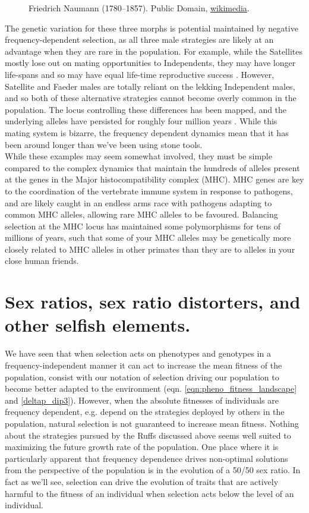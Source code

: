{\begin{figure}
{{{    Friedrich Naumann (1780–1857). Public Domain,
    \href{https://en.wikipedia.org/wiki/Ruff\#/media/File:Philomachus_pugnax_naumann.jpg}{wikimedia}.}}}\label{fig:Ruff}  
\end{figure}
The genetic variation for these three morphs is potential maintained by
negative frequency-dependent selection, as all three male strategies
are likely at an advantage when they are rare in the population. For
example, while the Satellites mostly lose out on mating opportunities
to Independents, they may have longer life-spans and so may have equal
life-time reproductive success \citep{widemo1998alternative}. However, Satellite and Faeder males
are totally reliant on the lekking Independent males, and so both of
these alternative strategies cannot become overly common in the
population. The locus controlling these differences has been mapped,
and the underlying alleles have persisted for roughly four million years
\citep{kupper2016supergene,lamichhaney2016structural}. While this mating system is
bizarre, the frequency dependent dynamics mean that it has been around
longer than we've been using stone tools. \\ 

While these examples may seem somewhat involved, they must be simple
compared to the complex dynamics that maintain the hundreds of alleles
present at the genes in the Major histocompatibility complex (MHC). MHC
genes are key to the coordination of the vertebrate immune
system in response to pathogens, and are likely caught in an endless arms
race with pathogens adapting to common MHC alleles, allowing rare MHC
alleles to be favoured. Balancing selection at the MHC locus has maintained
some polymorphisms for tens of millions of years, such that some of
your MHC alleles may be genetically more closely related to MHC alleles in other primates than they are to alleles in your
close human friends. 


\section{Sex ratios, sex ratio distorters, and other selfish
  elements. }

We have seen that when selection acts on phenotypes and genotypes in a
frequency-independent manner it can act to
increase the mean fitness of the population, consist with our
notation of selection driving our population to become better adapted
to the environment (eqn. \eqref{eqn:pheno_fitness_landscape} and \eqref{deltap_dip3}). However, when the
absolute fitnesses of individuals are frequency dependent, e.g. depend
on the strategies deployed by others in the population, natural
selection is not guaranteed to increase mean fitness. Nothing about
the strategies pursued by the Ruffs discussed above seems well suited to
maximizing the future growth rate of the population. 
One place where it is particularly apparent that frequency dependence
drives non-optimal solutions from the perspective of the population is in the evolution of a 50/50 sex
ratio. In fact as we'll see, selection can drive the evolution of
traits that are actively harmful to the fitness of an individual when
selection acts below the level of an individual. 

}
